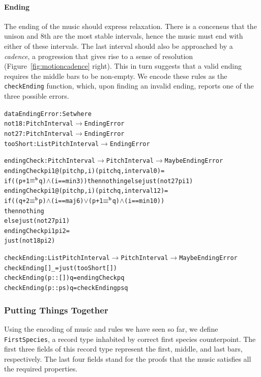 \paragraph{Ending}

The ending of the music should express relaxation.
There is a concensus that the unison and 8th are the most stable
intervals, hence the music must end with either of these intervals.
The last interval should also be approached by a \emph{cadence},
a progression that gives rise to a sense of resolution
(Figure~\ref{fig:motioncadence} right).
This in turn suggests that a valid ending requires the middle bars
to be non-empty.
We encode these rules as the \texttt{checkEnding} function, which,
upon finding an invalid ending, reports one of the three possible
errors.

\begin{alltt}
data EndingError : Set where
  not18    : PitchInterval      \(\rightarrow\) EndingError
  not27    : PitchInterval      \(\rightarrow\) EndingError
  tooShort : List PitchInterval \(\rightarrow\) EndingError

endingCheck : PitchInterval \(\rightarrow\) PitchInterval \(\rightarrow\) Maybe EndingError
endingCheck pi1@(pitch p , i) (pitch q , interval 0)  = 
  if ((p + 1 \(\equiv\sp{\mathtt{b}}\) q) \(\wedge\) (i == min3)) then nothing else just (not27 pi1)
endingCheck pi1@(pitch p , i) (pitch q , interval 12) =
  if ((q + 2 \(\equiv\sp{\mathtt{b}}\) p) \(\wedge\) (i == maj6) \(\vee\) (p + 1 \(\equiv\sp{\mathtt{b}}\) q) \(\wedge\) (i == min10))
  then nothing
  else just (not27 pi1)
endingCheck pi1               pi2                     =
  just (not18 pi2)

checkEnding : List PitchInterval \(\rightarrow\) PitchInterval \(\rightarrow\) Maybe EndingError
checkEnding []        \_ = just (tooShort [])
checkEnding (p :: []) q = endingCheck p q
checkEnding (p :: ps) q = checkEnding ps q
\end{alltt}

\subsubsection{Putting Things Together}

Using the encoding of music and rules we have seen so far, we define
\texttt{FirstSpecies}, a record type inhabited by correct first species
counterpoint.
The first three fields of this record type represent the first, middle,
and last bars, respectively.
The last four fields stand for the proofs that the music satisfies all
the required properties.

